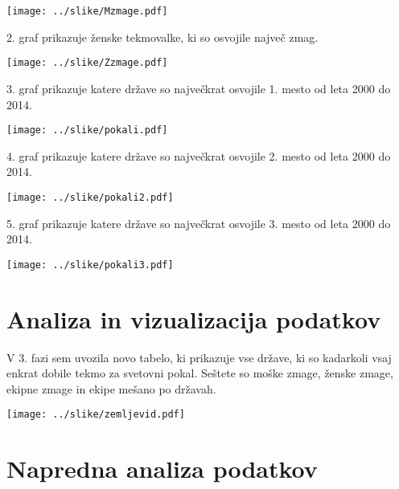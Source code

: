 \documentclass[11pt,a4paper]{article}
\begin{document}
\texttt{[image: ../slike/Mzmage.pdf]}

2. graf prikazuje ženske tekmovalke, ki so osvojile največ zmag.

\texttt{[image: ../slike/Zzmage.pdf]}

3. graf prikazuje katere države so največkrat osvojile 1. mesto od leta 2000 do 2014.

\texttt{[image: ../slike/pokali.pdf]}

4. graf prikazuje katere države so največkrat osvojile 2. mesto od leta 2000 do 2014.

\texttt{[image: ../slike/pokali2.pdf]}

5. graf prikazuje katere države so največkrat osvojile 3. mesto od leta 2000 do 2014.

\texttt{[image: ../slike/pokali3.pdf]}


\section{Analiza in vizualizacija podatkov}
V 3. fazi sem uvozila novo tabelo, ki prikazuje vse države, ki so kadarkoli vsaj enkrat dobile tekmo za svetovni pokal. Seštete so moške zmage, ženske zmage, ekipne zmage in ekipe mešano po državah.

\texttt{[image: ../slike/zemljevid.pdf]}

\section{Napredna analiza podatkov}

\end{document}
